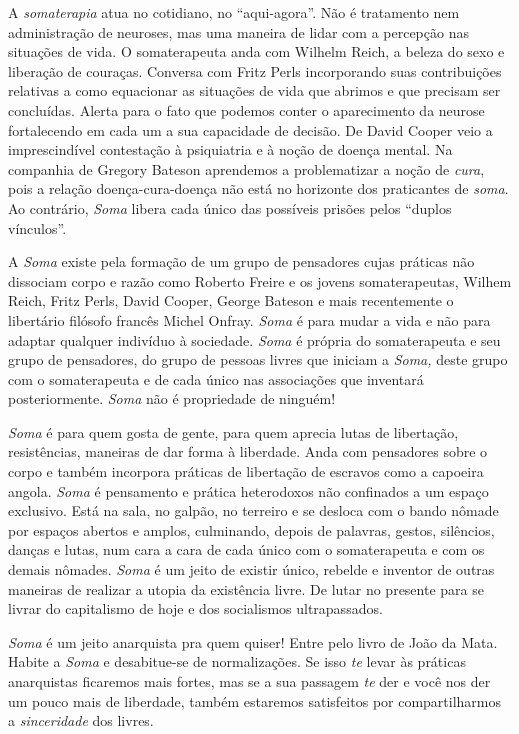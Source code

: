 A \emph{somaterapia} atua no cotidiano, no ``aqui-agora''. Não é
tratamento nem administração de neuroses, mas uma maneira de lidar com a
percepção nas situações de vida. O somaterapeuta anda com Wilhelm Reich,
a beleza do sexo e liberação de couraças. Conversa com Fritz Perls
incorporando suas contribuições relativas a como equacionar as situações
de vida que abrimos e que precisam ser concluídas. Alerta para o fato
que podemos conter o aparecimento da neurose fortalecendo em cada um a
sua capacidade de decisão. De David Cooper veio a imprescindível
contestação à psiquiatria e à noção de doença mental. Na companhia de
Gregory Bateson aprendemos a problematizar a noção de \emph{cura}, pois
a relação doença-cura-doença não está no horizonte dos praticantes de
\emph{soma}. Ao contrário, \emph{Soma} libera cada único das possíveis
prisões pelos ``duplos vínculos''.

A \emph{Soma} existe pela formação de um grupo de pensadores cujas
práticas não dissociam corpo e razão como Roberto Freire e os jovens
somaterapeutas, Wilhem Reich, Fritz Perls, David Cooper, George Bateson
e mais recentemente o libertário filósofo francês Michel Onfray.
\emph{Soma} é para mudar a vida e não para adaptar qualquer indivíduo à
sociedade. \emph{Soma} é própria do somaterapeuta e seu grupo de
pensadores, do grupo de pessoas livres que iniciam a \emph{Soma,} deste
grupo com o somaterapeuta e de cada único nas associações que inventará
posteriormente. \emph{Soma} não é propriedade de ninguém!

\emph{Soma} é para quem gosta de gente, para quem aprecia lutas de
libertação, resistências, maneiras de dar forma à liberdade. Anda com
pensadores sobre o corpo e também incorpora práticas de libertação de
escravos como a capoeira angola. \emph{Soma} é pensamento e prática
heterodoxos não confinados a um espaço exclusivo. Está na sala, no
galpão, no terreiro e se desloca com o bando nômade por espaços abertos
e amplos, culminando, depois de palavras, gestos, silêncios, danças e
lutas, num cara a cara de cada único com o somaterapeuta e com os demais
nômades. \emph{Soma} é um jeito de existir único, rebelde e inventor de
outras maneiras de realizar a utopia da existência livre. De lutar no
presente para se livrar do capitalismo de hoje e dos socialismos
ultrapassados.

\emph{Soma} é um jeito anarquista pra quem quiser! Entre pelo livro de
João da Mata. Habite a \emph{Soma} e desabitue-se de normalizações. Se
isso \emph{te} levar às práticas anarquistas ficaremos mais fortes, mas
se a sua passagem \emph{te} der e você nos der um pouco mais de
liberdade, também estaremos satisfeitos por compartilharmos a
\emph{sinceridade} dos livres.

